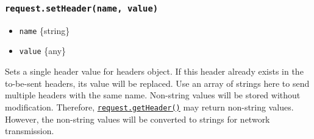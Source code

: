 \begin{Shaded}
\begin{Highlighting}[]
\OperatorTok{=} \NormalTok{(}\NormalTok{)}\OperatorTok{;}
\OperatorTok{=} \NormalTok{(\{ }\OperatorTok{:} \NormalTok{ \})}\OperatorTok{;}

 \NormalTok{() \{}
  \OperatorTok{=}
    \NormalTok{(}\OperatorTok{,}\OperatorTok{,}\KeywordTok{=\textgreater{}}\NormalTok{ \{}
\NormalTok{    \})}
    \NormalTok{(}\OperatorTok{,}\KeywordTok{=\textgreater{}}\NormalTok{ \{}
       \OperatorTok{\&\&} \OperatorTok{===} \NormalTok{) \{}
        \NormalTok{()}\OperatorTok{;}
\NormalTok{      \}}
\NormalTok{    \})}\OperatorTok{;}
\NormalTok{\}}

\NormalTok{()}\OperatorTok{;}
\end{Highlighting}
\end{Shaded}

\subsubsection{\texorpdfstring{\texttt{request.setHeader(name,\ value)}}{request.setHeader(name, value)}}\label{request.setheadername-value}

\begin{itemize}
\tightlist
\item
  \texttt{name} \{string\}
\item
  \texttt{value} \{any\}
\end{itemize}

Sets a single header value for headers object. If this header already
exists in the to-be-sent headers, its value will be replaced. Use an
array of strings here to send multiple headers with the same name.
Non-string values will be stored without modification. Therefore,
\hyperref[requestgetheadername]{\texttt{request.getHeader()}} may return
non-string values. However, the non-string values will be converted to
strings for network transmission.

